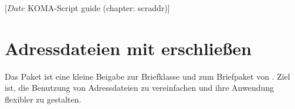 %
%
%
%
%
%
%
%
% 
%
%
%
%

                 [$Date$
                  KOMA-Script guide (chapter: scraddr)]

\chapter{Adressdateien mit  erschließen}%
%
\BeginIndexGroup
{}

Das Paket  ist eine kleine Beigabe zur Briefklasse und zum
Briefpaket von \KOMAScript.  Ziel ist, die Benutzung von Adressdateien zu
vereinfachen und ihre Anwendung flexibler zu gestalten.

